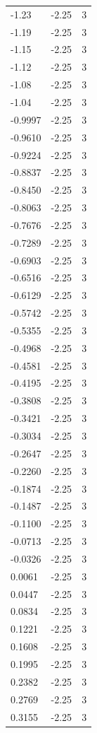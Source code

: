 \begin{longtable}{lrr}
  -1.23 & -2.25 & 3 \\
  -1.19 & -2.25 & 3 \\
  -1.15 & -2.25 & 3 \\
  -1.12 & -2.25 & 3 \\
  -1.08 & -2.25 & 3 \\
  -1.04 & -2.25 & 3 \\
  -0.9997 & -2.25 & 3 \\
  -0.9610 & -2.25 & 3 \\
  -0.9224 & -2.25 & 3 \\
  -0.8837 & -2.25 & 3 \\
  -0.8450 & -2.25 & 3 \\
  -0.8063 & -2.25 & 3 \\
  -0.7676 & -2.25 & 3 \\
  -0.7289 & -2.25 & 3 \\
  -0.6903 & -2.25 & 3 \\
  -0.6516 & -2.25 & 3 \\
  -0.6129 & -2.25 & 3 \\
  -0.5742 & -2.25 & 3 \\
  -0.5355 & -2.25 & 3 \\
  -0.4968 & -2.25 & 3 \\
  -0.4581 & -2.25 & 3 \\
  -0.4195 & -2.25 & 3 \\
  -0.3808 & -2.25 & 3 \\
  -0.3421 & -2.25 & 3 \\
  -0.3034 & -2.25 & 3 \\
  -0.2647 & -2.25 & 3 \\
  -0.2260 & -2.25 & 3 \\
  -0.1874 & -2.25 & 3 \\
  -0.1487 & -2.25 & 3 \\
  -0.1100 & -2.25 & 3 \\
  -0.0713 & -2.25 & 3 \\
  -0.0326 & -2.25 & 3 \\
  0.0061 & -2.25 & 3 \\
  0.0447 & -2.25 & 3 \\
  0.0834 & -2.25 & 3 \\
  0.1221 & -2.25 & 3 \\
  0.1608 & -2.25 & 3 \\
  0.1995 & -2.25 & 3 \\
  0.2382 & -2.25 & 3 \\
  0.2769 & -2.25 & 3 \\
  0.3155 & -2.25 & 3 \\

\end{longtable}
